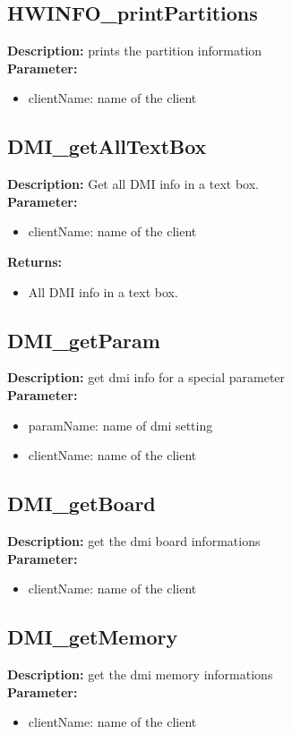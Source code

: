 \subsection{HWINFO\_printPartitions}
\textbf{Description:} prints the partition information\\
\textbf{Parameter:}
\begin{itemize}
\item clientName: name of the client
\end{itemize}

\subsection{DMI\_getAllTextBox}
\textbf{Description:} Get all DMI info in a text box.\\
\textbf{Parameter:}
\begin{itemize}
\item clientName: name of the client
\end{itemize}
\textbf{Returns:}
\begin{itemize}
\item All DMI info in a text box.
\end{itemize}

\subsection{DMI\_getParam}
\textbf{Description:} get dmi info for a special parameter\\
\textbf{Parameter:}
\begin{itemize}
\item paramName: name of dmi setting
\item clientName: name of the client
\end{itemize}

\subsection{DMI\_getBoard}
\textbf{Description:} get the dmi board informations\\
\textbf{Parameter:}
\begin{itemize}
\item clientName: name of the client
\end{itemize}

\subsection{DMI\_getMemory}
\textbf{Description:} get the dmi memory informations\\
\textbf{Parameter:}
\begin{itemize}
\item clientName: name of the client
\end{itemize}

